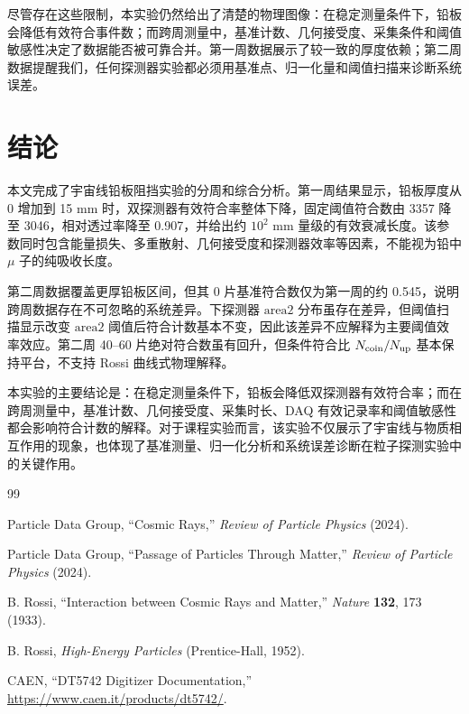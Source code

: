 \documentclass[aps,prl,twocolumn,superscriptaddress,nofootinbib]{revtex4-2}
\begin{document}
尽管存在这些限制，本实验仍然给出了清楚的物理图像：在稳定测量条件下，铅板会降低有效符合事件数；而跨周测量中，基准计数、几何接受度、采集条件和阈值敏感性决定了数据能否被可靠合并。第一周数据展示了较一致的厚度依赖；第二周数据提醒我们，任何探测器实验都必须用基准点、归一化量和阈值扫描来诊断系统误差。

\section{结论}

本文完成了宇宙线铅板阻挡实验的分周和综合分析。第一周结果显示，铅板厚度从 0 增加到 15 mm 时，双探测器有效符合率整体下降，固定阈值符合数由 3357 降至 3046，相对透过率降至 0.907，并给出约 $10^2$ mm 量级的有效衰减长度。该参数同时包含能量损失、多重散射、几何接受度和探测器效率等因素，不能视为铅中 \(\mu\) 子的纯吸收长度。

第二周数据覆盖更厚铅板区间，但其 0 片基准符合数仅为第一周的约 0.545，说明跨周数据存在不可忽略的系统差异。下探测器 \(\mathrm{area2}\) 分布虽存在差异，但阈值扫描显示改变 \(\mathrm{area2}\) 阈值后符合计数基本不变，因此该差异不应解释为主要阈值效率效应。第二周 40--60 片绝对符合数虽有回升，但条件符合比 \(N_{\rm coin}/N_{\rm up}\) 基本保持平台，不支持 Rossi 曲线式物理解释。

本实验的主要结论是：在稳定测量条件下，铅板会降低双探测器有效符合率；而在跨周测量中，基准计数、几何接受度、采集时长、DAQ 有效记录率和阈值敏感性都会影响符合计数的解释。对于课程实验而言，该实验不仅展示了宇宙线与物质相互作用的现象，也体现了基准测量、归一化分析和系统误差诊断在粒子探测实验中的关键作用。

\begin{thebibliography}{99}

Particle Data Group, ``Cosmic Rays,'' \textit{Review of Particle Physics} (2024).

Particle Data Group, ``Passage of Particles Through Matter,'' \textit{Review of Particle Physics} (2024).

B. Rossi, ``Interaction between Cosmic Rays and Matter,'' \textit{Nature} \textbf{132}, 173 (1933).

B. Rossi, \textit{High-Energy Particles} (Prentice-Hall, 1952).

CAEN, ``DT5742 Digitizer Documentation,'' \url{https://www.caen.it/products/dt5742/}.

\end{thebibliography}
\end{document}
